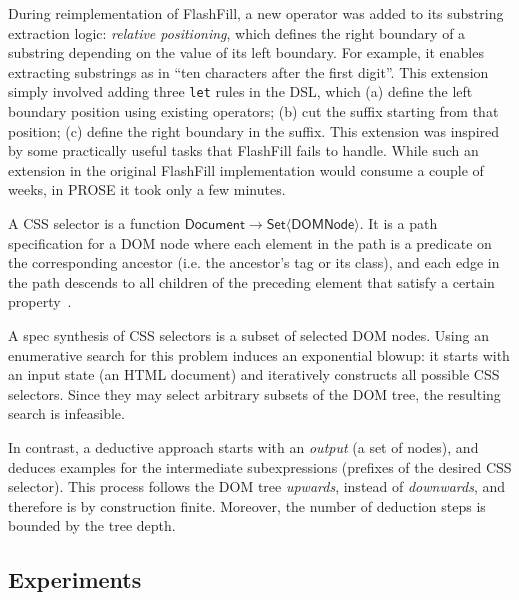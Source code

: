 \begin{scenario}
    During reimplementation of FlashFill, a new operator was added to its substring extraction logic: \emph{relative
    positioning},
    which defines the right boundary of a substring depending on the value of its left boundary.
    For example, it enables extracting substrings as in ``ten characters after the first digit''.
    This extension simply involved adding three \texttt{let} rules in the DSL, which (a) define the left boundary
    position using existing operators; (b) cut the suffix starting from that position; (c) define the right boundary in
    the suffix.
    This extension was inspired by some practically useful tasks that FlashFill fails to handle.
    While such an extension in the original FlashFill implementation would consume a couple of weeks, in PROSE it
    took only a few minutes.
\end{scenario}

\begin{scenario}
    A CSS selector is a function $\mathsf{Document} \to \mathsf{Set}\langle \mathsf{DOMNode}\rangle$.
    It is a path specification for a DOM node where each element in the path is a predicate on the corresponding
    ancestor (i.e.  the ancestor's tag or its class), and each edge in the path descends to all children of the
    preceding element that satisfy a certain property~\cite{css3selectors}.

    A spec synthesis of CSS selectors is a subset of selected DOM nodes.
    Using an enumerative search for this problem induces an exponential blowup: it starts with an input state (an HTML
    document) and iteratively constructs all possible CSS selectors.
    Since they may select arbitrary subsets of the DOM tree, the resulting search is infeasible.

    In contrast, a deductive approach starts with an \emph{output} (a set of nodes), and deduces examples for the
    intermediate subexpressions (prefixes of the desired CSS selector).
    This process follows the DOM tree \emph{upwards}, instead of \emph{downwards}, and therefore is by construction
    finite.
    Moreover, the number of deduction steps is bounded by the tree depth.
\end{scenario}

\subsection{Experiments}
\label{sec:prose:evaluation:experiments}

